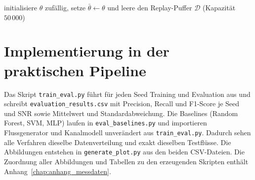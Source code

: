 \begin{algorithm}[htbp]
	\small
	\caption{DDQN-Training mit gemischtem SNR je Seed (entspricht \texttt{train} und \texttt{learn} in \texttt{train\_eval.py})}
	\label{alg:training}
	initialisiere $\theta$ zufällig, setze $\bar\theta\leftarrow\theta$ und leere den Replay-Puffer $\mathcal{D}$ (Kapazität $50\,000$)\;
\end{algorithm}

\section{Implementierung in der praktischen Pipeline}
\label{sec:praktische_pipeline}

Das Skript \texttt{train\_eval.py} führt für jeden Seed Training und Evaluation aus und schreibt \texttt{evaluation\_results.csv} mit Precision, Recall und F1-Score je Seed und SNR sowie Mittelwert und Standardabweichung. Die Baselines (Random Forest, SVM, MLP) laufen in \texttt{eval\_baselines.py} und importieren Flussgenerator und Kanalmodell unverändert aus \texttt{train\_eval.py}. Dadurch sehen alle Verfahren dieselbe Datenverteilung und exakt dieselben Testflüsse. Die Abbildungen entstehen in \texttt{generate\_plot.py} aus den beiden CSV-Dateien. Die Zuordnung aller Abbildungen und Tabellen zu den erzeugenden Skripten enthält Anhang~\ref{chap:anhang_messdaten}.

